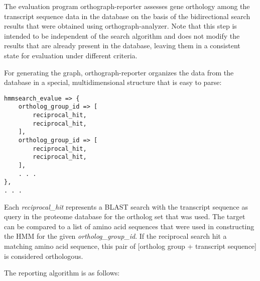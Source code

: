 \label{sec:algorithm-reporting}
The evaluation program orthograph-reporter assesses gene orthology among the
transcript sequence data in the database on the basis of the bidirectional
search results that were obtained using orthograph-analyzer. Note that this step
is intended to be independent of the search algorithm and does not modify
the results that are already present in the database, leaving them in a
consistent state for evaluation under different criteria.

For generating the graph, orthograph-reporter organizes the data from the database
in a special, multidimensional structure that is easy to parse:

\begin{lstlisting}[label={lst:structure},caption={Data structure for parsing the triangular
relationships between ortholog groups and transcripts}]
hmmsearch_evalue => {
	ortholog_group_id => [
		reciprocal_hit,
		reciprocal_hit,
	],
	ortholog_group_id => [
		reciprocal_hit,
		reciprocal_hit,
	],
	. . .
},
. . .
\end{lstlisting}

Each \emph{reciprocal\_hit} represents a BLAST search with the transcript
sequence as query in the proteome database for the ortholog set that was used.
The target can be compared to a list of amino acid sequences that were used in
constructing the HMM for the given \emph{ortholog\_group\_id}. If the reciprocal
search hit a matching amino acid sequence, this pair of [ortholog group +
transcript sequence] is considered orthologous.

The reporting algorithm is as follows:

